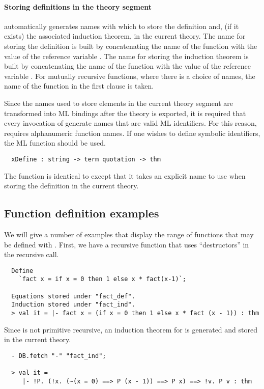 \paragraph{Storing definitions in the theory segment}

  automatically generates names with which to store the
definition and, (if it exists) the associated induction theorem, in
the current theory. The name for storing the definition is built by
concatenating the name of the function with the value of the reference
variable . The name for storing the induction theorem
is built by concatenating the name of the function with the value of
the reference variable . For mutually recursive
functions, where there is a choice of names, the name of the function
in the first clause is taken.

 Since the names used to store elements in the current theory segment
are transformed into ML bindings after the theory is exported, it is
required that every invocation of  generate names that are
valid ML identifiers. For this reason,  requires
alphanumeric function names. If one wishes to define symbolic
identifiers, the ML function  should be used.

\begin{hol}
\begin{verbatim}
  xDefine : string -> term quotation -> thm
\end{verbatim}
\end{hol}
The  function is identical to
 except that it takes an explicit name to use when
storing the definition in the current theory.

\subsection{Function definition examples}
 We will give a number of examples that display the range of functions
that may be defined with . First, we have a recursive function
that uses ``destructors'' in the recursive call.

\begin{hol}
\begin{verbatim}
  Define
    `fact x = if x = 0 then 1 else x * fact(x-1)`;

  Equations stored under "fact_def".
  Induction stored under "fact_ind".
  > val it = |- fact x = (if x = 0 then 1 else x * fact (x - 1)) : thm
\end{verbatim}
\end{hol}
%
Since  is not
primitive recursive, an induction theorem for  is generated and
stored in the current theory.
%
\begin{hol}
\begin{verbatim}
  - DB.fetch "-" "fact_ind";

  > val it =
     |- !P. (!x. (~(x = 0) ==> P (x - 1)) ==> P x) ==> !v. P v : thm
\end{verbatim}
\end{hol}

